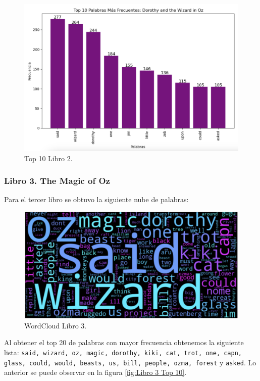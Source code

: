 \documentclass[conference]{IEEEtran}
\begin{document}
	\begin{figure}[h]
    \centering
    \includegraphics[width=0.9\linewidth]{Libro 2 Top 10 palabras más frecuentes.png}
    \caption{Top 10 Libro 2.}
    \label{fig:Libro 2 Top 10}
	\end{figure}

	\FloatBarrier

\newpage 

\subsubsection{Libro 3. The Magic of Oz}

Para el tercer libro se obtuvo la siguiente nube de palabras:

	\begin{figure}[h]
    \centering
    \includegraphics[width=0.8\linewidth]{Libro 3 WordCloud.png}
    \caption{WordCloud Libro 3.}
    \label{fig:Libro 3 WordCloud}
	\end{figure}

	\FloatBarrier

Al obtener el top 20 de palabras con mayor frecuencia obtenemos la siguiente lista: \texttt{said, wizard, oz, magic, dorothy, kiki, cat, trot, one, capn, glass, could, would, beasts, us, bill, people, ozma, forest} y \texttt{asked}. Lo anterior se puede observar en la figura \ref{fig:Libro 3 Top 10}.  
\end{document}
